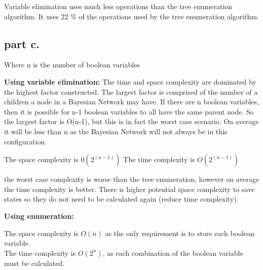 Variable elimination uses much less operations than the tree enumeration algorithm. It uses 22 \% of the operations used by the tree enumeration algorithm.


\subsection{part c.}

Where n is the number of boolean variables

\textbf{Using variable elimination:}
The time and space complexity are dominated by the highest factor constructed. The largest factor is comprised of the number of a children a node in a Bayesian Network may have. If there are n boolean variables, then it is possible for n-1 boolean variables to all have the same parent node. So the largest factor is O(n-1), but this is in fact the worst case scenario. On average it will be less than n as the Bayesian Network will not always be in this configuration.

The space complexity is $0(2^{(n-1)})$
The time complexity is $O(2^{(n-1)})$

the worst case complexity is worse than the tree enumeration, however on average the time complexity is better. There is higher potential space complexity to save states so they do not need to be calculated again (reduce time complexity).


\textbf{Using enumeration:}

The space complexity is $O(n)$ as the only requirement is to store each boolean variable. \\
The time complexity is $O(2^n)$, as each combination of the boolean variable must be calculated.
